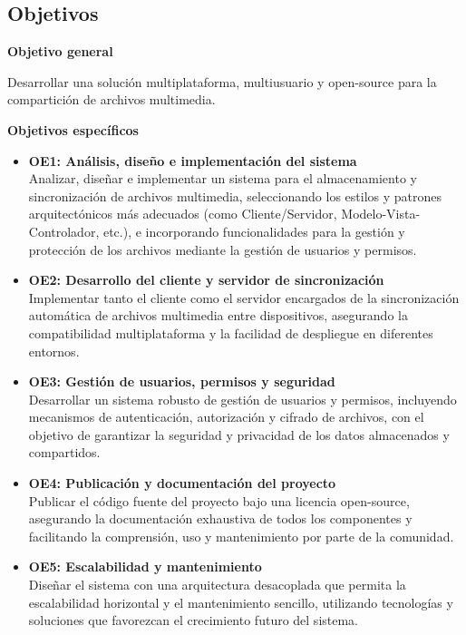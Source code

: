 \subsection{Objetivos}

\textbf{Objetivo general}

Desarrollar una solución multiplataforma, multiusuario y open-source para la compartición de archivos multimedia.

\textbf{Objetivos específicos}

\begin{itemize}
    \item \textbf{OE1: Análisis, diseño e implementación del sistema} \\
    Analizar, diseñar e implementar un sistema para el almacenamiento y sincronización de archivos multimedia, seleccionando los estilos y patrones arquitectónicos más adecuados (como Cliente/Servidor, Modelo-Vista-Controlador, etc.), e incorporando funcionalidades para la gestión y protección de los archivos mediante la gestión de usuarios y permisos.

    \item \textbf{OE2: Desarrollo del cliente y servidor de sincronización} \\
    Implementar tanto el cliente como el servidor encargados de la sincronización automática de archivos multimedia entre dispositivos, asegurando la compatibilidad multiplataforma y la facilidad de despliegue en diferentes entornos.

    \item \textbf{OE3: Gestión de usuarios, permisos y seguridad} \\
    Desarrollar un sistema robusto de gestión de usuarios y permisos, incluyendo mecanismos de autenticación, autorización y cifrado de archivos, con el objetivo de garantizar la seguridad y privacidad de los datos almacenados y compartidos.

    \item \textbf{OE4: Publicación y documentación del proyecto} \\
    Publicar el código fuente del proyecto bajo una licencia open-source, asegurando la documentación exhaustiva de todos los componentes y facilitando la comprensión, uso y mantenimiento por parte de la comunidad.

    \item \textbf{OE5: Escalabilidad y mantenimiento} \\
    Diseñar el sistema con una arquitectura desacoplada que permita la escalabilidad horizontal y el mantenimiento sencillo, utilizando tecnologías y soluciones que favorezcan el crecimiento futuro del sistema.


\end{itemize}
